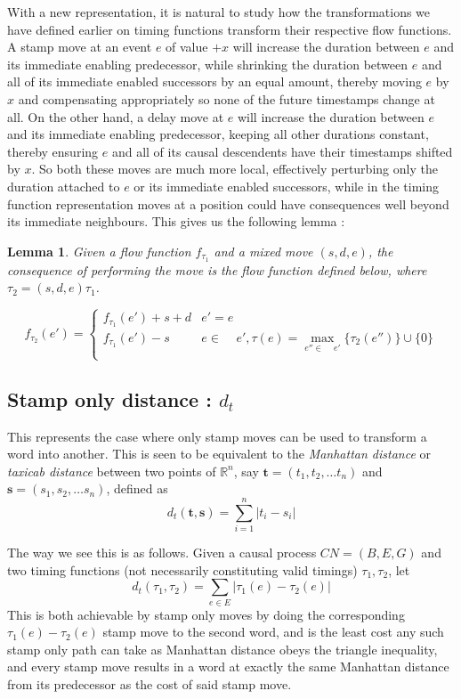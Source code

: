 \documentclass{article}
\newcounter{cases}
\DeclareMathOperator*{\pre}{^\bullet}
\newtheorem{lemma}[theorem]{Lemma}
\theoremstyle{Definition}
\theoremstyle{definition}
\begin{document}
With a new representation, it is natural to study how the transformations we have defined earlier on timing functions transform their respective flow functions. A stamp move at an event $e$ of value $+x$ will increase the duration between $e$ and its immediate enabling predecessor, while shrinking the duration between $e$ and all of its immediate enabled successors by an equal amount, thereby moving $e$ by $x$ and compensating appropriately so none of the future timestamps change at all. 
On the other hand, a delay move at $e$ will increase the duration between $e$ and its immediate enabling predecessor, keeping all other durations constant, thereby ensuring $e$ and all of its causal descendents have their timestamps shifted by $x$. 
So both these moves are much more local, effectively perturbing only the duration attached to $e$ or its immediate enabled successors, while in the timing function representation moves at a position could have consequences well beyond its immediate neighbours. 
This gives us the following lemma : 

\begin{lemma}\label{FlowFuncTrans}
	Given a flow function $f_{\tau_1}$ and a mixed move $(s, d, e)$, the consequence of performing the move is the flow function defined below, where $\tau_2 = (s, d, e)\tau_1$. 
		
	$$f_{\tau_2}(e') = \begin{cases} 
		f_{\tau_1}(e') + s + d & e' = e\\
			f_{\tau_1}(e') - s  &e \in   \pre \pre e', \tau(e) = \max\limits_{e'' \in \pre \pre e'} {\{\tau_2(e'')\}} \cup \{0\}\\
	\end{cases}
	$$
	
\end{lemma}

	\subsection{Stamp only distance : $d_t$}
	
	This represents the case where only stamp moves can be used to transform a word into another. 
	This is seen to be equivalent to the \textit{Manhattan distance} or \textit{taxicab distance} between two points of $\mathbb{R}^n$, say $\mathbf{t} = (t_1, t_2, \dots t_n) $ and $\mathbf{s} = (s_1, s_2, \dots s_n)$, defined as $$d_t(\mathbf{t}, \mathbf{s}) = \sum_{i = 1}^{n} |t_i - s_i|$$
	
	The way we see this is as follows. 
	Given a causal process $CN = (B, E, G)$ and two timing functions (not necessarily constituting valid timings) $\tau_1, \tau_2$, let $$d_t(\tau_1, \tau_2) = \sum_{e \in E} |\tau_1(e) - \tau_2(e)|$$
	This is both achievable by stamp only moves by doing the corresponding $\tau_1(e) - \tau_2(e)$ stamp move to the second word, and is the least cost any such stamp only path can take as Manhattan distance obeys the triangle inequality, and every stamp move results in a word at exactly the same Manhattan distance from its predecessor as the cost of said stamp move. 
	
\end{document}
